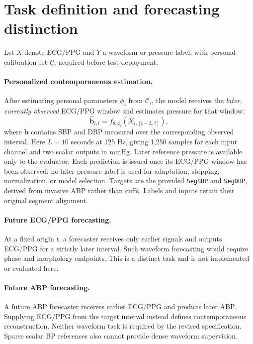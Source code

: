 \documentclass[11pt]{article}
\begin{document}
\section{Task definition and forecasting distinction}
Let $X$ denote ECG/PPG and $Y$ a waveform or pressure label, with personal calibration set $\mathcal C_i$ acquired before test deployment.

\paragraph{Personalized contemporaneous estimation.}
After estimating personal parameters $\phi_i$ from $\mathcal C_i$, the model receives the \emph{later, currently observed} ECG/PPG window and estimates pressure for that window:
\begin{equation}
 \widehat{\mathbf b}_{i,t}=f_{\theta,\phi_i}(X_{i,[t-L,t]}),
\end{equation}
where $\mathbf b$ contains SBP and DBP measured over the corresponding observed interval. Here $L=10$ seconds at 125 Hz, giving 1,250 samples for each input channel and two scalar outputs in mmHg. Later reference pressure is available only to the evaluator. Each prediction is issued once its ECG/PPG window has been observed; no later pressure label is used for adaptation, stopping, normalization, or model selection. Targets are the provided \texttt{SegSBP} and \texttt{SegDBP}, derived from invasive ABP rather than cuffs. Labels and inputs retain their original segment alignment.

\paragraph{Future ECG/PPG forecasting.}
At a fixed origin $t$, a forecaster receives only earlier signals and outputs ECG/PPG for a strictly later interval. Such waveform forecasting would require phase and morphology endpoints. This is a distinct task and is not implemented or evaluated here.

\paragraph{Future ABP forecasting.}
A future ABP forecaster receives earlier ECG/PPG and predicts later ABP. Supplying ECG/PPG from the target interval instead defines contemporaneous reconstruction. Neither waveform task is required by the revised specification. Sparse scalar BP references also cannot provide dense waveform supervision.
\end{document}
